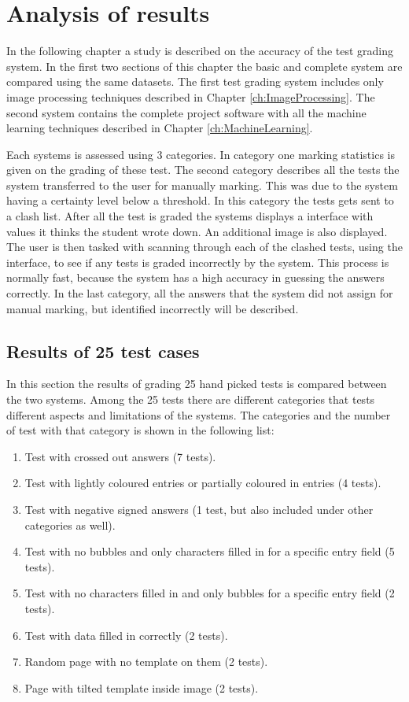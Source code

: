 \chapter{Analysis of results}
\label{ch:Results}
\ifpdf
\graphicspath{{Chapter5/Chapter5Figures/}}
\fi

In the following chapter a study is described on the accuracy of the test grading system. In the first two sections of this chapter the basic and complete system are compared using the same datasets. The first test grading system includes only image processing techniques described in Chapter \ref{ch:ImageProcessing}. The second system contains the complete project software with all the machine learning techniques described in Chapter \ref{ch:MachineLearning}.

Each systems is assessed using 3 categories. In category one marking statistics is given on the grading of these test. The second category describes all the tests the system transferred to the user for manually marking. This was due to the system having a certainty level below a threshold. In this category the tests gets sent to a clash list. After all the test is graded the systems displays a interface with values it thinks the student wrote down. An additional image is also displayed. The user is then tasked with scanning through each of the clashed tests, using the interface, to see if any tests is graded incorrectly by the system. This process is normally fast, because the system has a high accuracy in guessing the answers correctly. In the last category, all the answers that the system did not assign for manual marking, but identified incorrectly will be described.

\section{Results of 25 test cases}

In this section the results of grading 25 hand picked tests is compared between the two systems. Among the 25 tests there are different categories that tests different aspects and limitations of the systems. The categories and the number of test with that category is shown in the following list:

\begin{enumerate}
\item Test with crossed out answers (7 tests).
\item Test with lightly coloured entries or partially coloured in entries (4 tests).
\item Test with negative signed answers (1 test, but also included under other categories as well).
\item Test with no bubbles and only characters filled in for a specific entry field (5 tests).
\item Test with no characters filled in and only bubbles for a specific entry field (2 tests).
\item Test with data filled in correctly (2 tests).
\item Random page with no template on them (2 tests).
\item Page with tilted template inside image (2 tests).
\end{enumerate}

